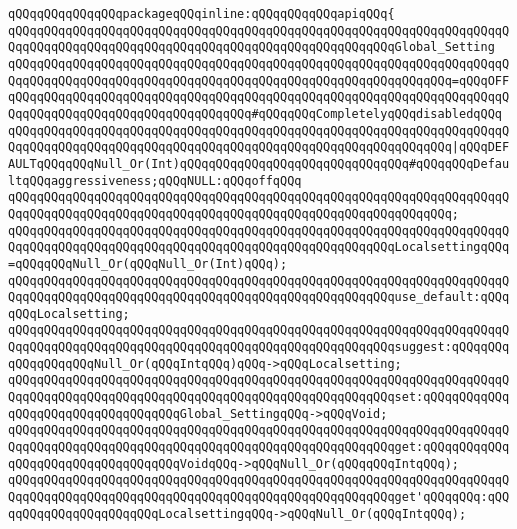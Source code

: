\newline
\verb|qQQqqQQqqQQqqQQqpackageqQQqinline:qQQqqQQqqQQqapiqQQq{|\newline
\verb|qQQqqQQqqQQqqQQqqQQqqQQqqQQqqQQqqQQqqQQqqQQqqQQqqQQqqQQqqQQqqQQqqQQqqQQqqQQqqQQqqQQqqQQqqQQqqQQqqQQqqQQqqQQqqQQqqQQqqQQqqQQqGlobal_Setting|\newline
\verb|qQQqqQQqqQQqqQQqqQQqqQQqqQQqqQQqqQQqqQQqqQQqqQQqqQQqqQQqqQQqqQQqqQQqqQQqqQQqqQQqqQQqqQQqqQQqqQQqqQQqqQQqqQQqqQQqqQQqqQQqqQQqqQQqqQQq=qQQqOFFqQQqqQQqqQQqqQQqqQQqqQQqqQQqqQQqqQQqqQQqqQQqqQQqqQQqqQQqqQQqqQQqqQQqqQQqqQQqqQQqqQQqqQQqqQQqqQQqqQQqqQQq#qQQqqQQqCompletelyqQQqdisabledqQQq|\newline
\verb|qQQqqQQqqQQqqQQqqQQqqQQqqQQqqQQqqQQqqQQqqQQqqQQqqQQqqQQqqQQqqQQqqQQqqQQqqQQqqQQqqQQqqQQqqQQqqQQqqQQqqQQqqQQqqQQqqQQqqQQqqQQqqQQqqQQq|\verb#|qQQqDEFAULTqQQqqQQqNull_Or(Int)qQQqqQQqqQQqqQQqqQQqqQQqqQQqqQQq#\verb|#qQQqqQQqDefaultqQQqaggressiveness;qQQqNULL:qQQqoffqQQq|\newline
\verb|qQQqqQQqqQQqqQQqqQQqqQQqqQQqqQQqqQQqqQQqqQQqqQQqqQQqqQQqqQQqqQQqqQQqqQQqqQQqqQQqqQQqqQQqqQQqqQQqqQQqqQQqqQQqqQQqqQQqqQQqqQQqqQQqqQQq;|\newline
\newline
\verb|qQQqqQQqqQQqqQQqqQQqqQQqqQQqqQQqqQQqqQQqqQQqqQQqqQQqqQQqqQQqqQQqqQQqqQQqqQQqqQQqqQQqqQQqqQQqqQQqqQQqqQQqqQQqqQQqqQQqqQQqqQQqLocalsettingqQQq=qQQqqQQqNull_Or(qQQqNull_Or(Int)qQQq);|\newline
\newline
\verb|qQQqqQQqqQQqqQQqqQQqqQQqqQQqqQQqqQQqqQQqqQQqqQQqqQQqqQQqqQQqqQQqqQQqqQQqqQQqqQQqqQQqqQQqqQQqqQQqqQQqqQQqqQQqqQQqqQQqqQQqqQQquse_default:qQQqqQQqLocalsetting;|\newline
\verb|qQQqqQQqqQQqqQQqqQQqqQQqqQQqqQQqqQQqqQQqqQQqqQQqqQQqqQQqqQQqqQQqqQQqqQQqqQQqqQQqqQQqqQQqqQQqqQQqqQQqqQQqqQQqqQQqqQQqqQQqqQQqsuggest:qQQqqQQqqQQqqQQqqQQqNull_Or(qQQqIntqQQq)qQQq->qQQqLocalsetting;|\newline
\verb|qQQqqQQqqQQqqQQqqQQqqQQqqQQqqQQqqQQqqQQqqQQqqQQqqQQqqQQqqQQqqQQqqQQqqQQqqQQqqQQqqQQqqQQqqQQqqQQqqQQqqQQqqQQqqQQqqQQqqQQqqQQqset:qQQqqQQqqQQqqQQqqQQqqQQqqQQqqQQqqQQqGlobal_SettingqQQq->qQQqVoid;|\newline
\verb|qQQqqQQqqQQqqQQqqQQqqQQqqQQqqQQqqQQqqQQqqQQqqQQqqQQqqQQqqQQqqQQqqQQqqQQqqQQqqQQqqQQqqQQqqQQqqQQqqQQqqQQqqQQqqQQqqQQqqQQqqQQqget:qQQqqQQqqQQqqQQqqQQqqQQqqQQqqQQqqQQqVoidqQQq->qQQqNull_Or(qQQqqQQqIntqQQq);|\newline
\verb|qQQqqQQqqQQqqQQqqQQqqQQqqQQqqQQqqQQqqQQqqQQqqQQqqQQqqQQqqQQqqQQqqQQqqQQqqQQqqQQqqQQqqQQqqQQqqQQqqQQqqQQqqQQqqQQqqQQqqQQqqQQqget'qQQqqQQq:qQQqqQQqqQQqqQQqqQQqqQQqLocalsettingqQQq->qQQqNull_Or(qQQqIntqQQq);|\newline
